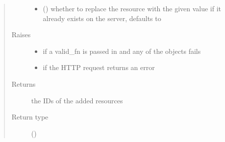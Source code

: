 \documentclass[letterpaper,10pt,english]{sphinxmanual}
\begin{document}
\begin{fulllineitems}
\begin{fulllineitems}
\begin{quote}
\begin{description}
\begin{itemize}
\item {} 
\sphinxAtStartPar
{} (\sphinxstyleliteralemphasis{\sphinxupquote{, }}) \textendash{} whether to replace the resource with the given value if it already exists on the server, defaults to 

\end{itemize}

\item[{Raises}] \leavevmode\begin{itemize}
\item {} 
\sphinxAtStartPar
{\hyperref[\detokenize{autoapi/pine/client/exceptions/index:pine.client.exceptions.PineClientValueException}]{}} \textendash{} if a valid\_fn is passed in and any of the objects fails

\item {} 
\sphinxAtStartPar
{\hyperref[\detokenize{autoapi/pine/client/exceptions/index:pine.client.exceptions.PineClientHttpException}]{}} \textendash{} if the HTTP request returns an error

\end{itemize}

\item[{Returns}] \leavevmode
\sphinxAtStartPar
the IDs of the added resources

\item[{Return type}] \leavevmode
\sphinxAtStartPar
{}()

\end{description}\end{quote}

\end{fulllineitems}



\end{fulllineitems}
\end{document}
